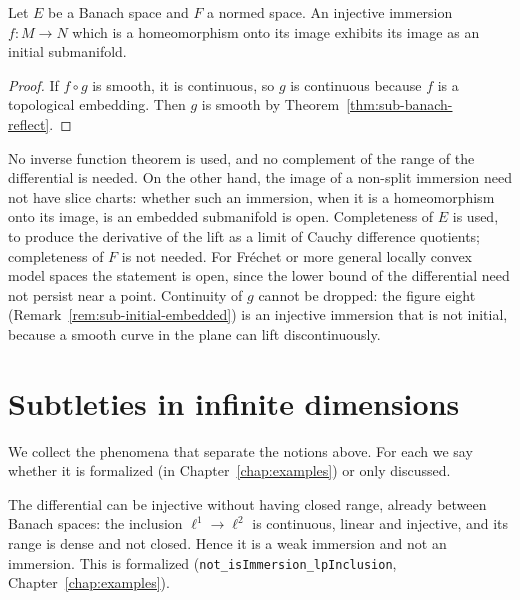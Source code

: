\begin{corollary}
  \label{cor:sub-banach-initial}
  \leanok
  Let $E$ be a Banach space and $F$ a normed space. An injective immersion $f \colon M \to N$
  which is a homeomorphism onto its image exhibits its image as an initial submanifold.
\end{corollary}

\begin{proof}
  \leanok
  If $f \circ g$ is smooth, it is continuous, so $g$ is continuous because $f$ is a topological
  embedding. Then $g$ is smooth by Theorem~\ref{thm:sub-banach-reflect}.
\end{proof}

\begin{remark}
  \label{rem:sub-banach-scope}
  No inverse function theorem is used, and no complement of the range of the differential is
  needed. On the other hand, the image of a non-split immersion need not have slice charts:
  whether such an immersion, when it is a homeomorphism onto its image, is an embedded
  submanifold is open. Completeness of $E$ is used, to produce the derivative of the lift as a
  limit of Cauchy difference quotients; completeness of $F$ is not needed. For Fréchet or more
  general locally convex model spaces the statement is open, since the lower bound of the
  differential need not persist near a point. Continuity of $g$ cannot be dropped: the figure
  eight (Remark~\ref{rem:sub-initial-embedded}) is an injective immersion that is not initial,
  because a smooth curve in the plane can lift discontinuously.
\end{remark}

\section{Subtleties in infinite dimensions}
\label{sec:sub-subtleties}

We collect the phenomena that separate the notions above. For each we say whether it is
formalized (in Chapter~\ref{chap:examples}) or only discussed.

\begin{remark}
  \label{rem:sub-weak-vs-immersion}
  The differential can be injective without having closed range, already between Banach
  spaces: the inclusion $\ell^1 \to \ell^2$ is continuous, linear and injective, and its range
  is dense and not closed. Hence it is a weak immersion and not an immersion. This is formalized
  (\texttt{not\_isImmersion\_lpInclusion}, Chapter~\ref{chap:examples}).
\end{remark}

